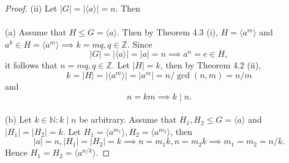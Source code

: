 \documentclass{article}
\theoremstyle{definition}
\begin{document}
\begin{proof}
    \noindent(ii) Let $|G|=|\langle a \rangle|=n$. Then
    \\ \\
    (a) Assume that $H \leq G = \langle a \rangle$. Then by Theorem 4.3 (i), $H = \langle a^m \rangle$ and $a^k \in H = \langle a^m \rangle \implies k = mq, q \in \mathbb{Z}$. Since
    \begin{equation*}
        |G| = |\langle a \rangle| = |a| = n \implies a^n=e\in H,
    \end{equation*}
    it follows that $n = mq, q \in \mathbb{Z}$. Let $|H|=k$, then by Theorem 4.2 (ii),
    \begin{equation*}
        k = |H| = |\langle a^m \rangle| = |a^m| = n/\gcd(n,m) = n/m
    \end{equation*}
    and 
    \begin{equation*}
        n=km \implies k \mid n.
    \end{equation*}
    \\
    (b) Let $k \in \mathbb{N}: k \mid n$ be arbitrary. Assume that $H_1,H_2 \leq G = \langle a \rangle$ and $|H_1|=|H_2|=k$. Let $H_1 = \langle a^{m_1} \rangle, H_2 = \langle a^{m_2} \rangle$, then
    \begin{equation*}
        |a| = n, |H_1|=|H_2|=k \implies n = m_1k, n = m_2k \implies m_1=m_2=n/k.
    \end{equation*}
    Hence $H_1 = H_2 = \langle a^{n/k} \rangle$.
\end{proof}
\end{document}
